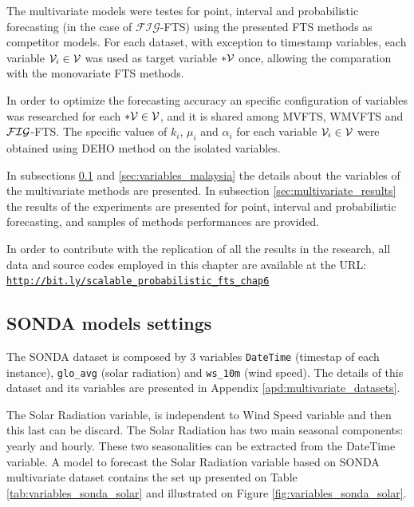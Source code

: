 The multivariate models were testes for point, interval and probabilistic forecasting (in the case of $\mathcal{FIG}$-FTS) using the presented FTS methods as competitor models. For each dataset, with exception to timestamp variables, each variable $\mathcal{V}_i \in \mathcal{V}$ was used as target variable $*\mathcal{V}$ once, allowing the comparation with the monovariate FTS methods. 

In order to optimize the forecasting accuracy an specific configuration of variables was researched for each $*\mathcal{V} \in \mathcal{V}$, and it is shared among MVFTS, WMVFTS and  $\mathcal{FIG}$-FTS. The specific values of $k_i$, $\mu_i$ and $\alpha_i$ for each variable $\mathcal{V}_i \in \mathcal{V}$ were obtained using DEHO method on the isolated variables.

In subsections \ref{sec:variables_sonda} and \ref{sec:variables_malaysia} the details about the variables of the multivariate methods are presented. In subsection \ref{sec:multivariate_results} the results of the experiments are presented for point, interval and probabilistic forecasting, and samples of methods performances are provided.

In order to contribute with the replication of all the results in the research, all data and source codes employed in this chapter are available at the URL:
\texttt{\url{http://bit.ly/scalable_probabilistic_fts_chap6}}

\subsection{SONDA models settings}
\label{sec:variables_sonda}

The SONDA dataset is composed by 3 variables \texttt{DateTime} (timestap of each instance), \texttt{glo\_avg} (solar radiation) and \texttt{ws\_10m} (wind speed). The details of this dataset and its variables are presented in Appendix \ref{apd:multivariate_datasets}. 

The Solar Radiation variable, is independent to Wind Speed variable and then this last can be discard. The Solar Radiation has two main seasonal components: yearly and hourly. These two seasonalities can be extracted from the DateTime variable.  A model to forecast the Solar Radiation variable based on SONDA  multivariate dataset contains the set up presented on Table \ref{tab:variables_sonda_solar} and illustrated on Figure \ref{fig:variables_sonda_solar}.

